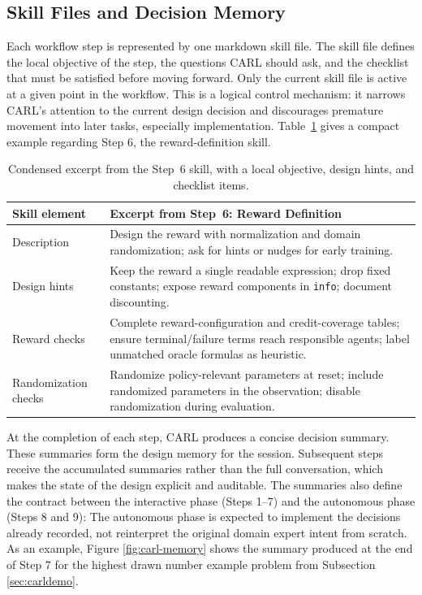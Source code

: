\documentclass[mnsc,sglanonrev]{informs4}
\begin{document}
\subsection{Skill Files and Decision Memory}
\label{skillz}

Each workflow step is represented by one markdown skill file. The skill file defines the local objective of the step, the questions CARL should ask, and the checklist that must be satisfied before moving forward. Only the current skill file is active at a given point in the workflow. This is a logical control mechanism: it narrows CARL's attention to the current design decision and discourages premature movement into later tasks, especially implementation. Table~\ref{tab:skill-excerpt} gives a compact example regarding Step 6, the reward-definition skill.

\begin{table}[ht]
\centering
\small
\begin{tabular}{@{}p{}p{}@{}}
\toprule
\textbf{Skill element} & \textbf{Excerpt from Step~6: Reward Definition}\\ \midrule
Description & Design the reward with normalization and domain randomization; ask for hints or nudges for early training.\\
Design hints & Keep the reward a single readable expression; drop fixed constants; expose reward components in \texttt{info}; document discounting.\\
Reward checks & Complete reward-configuration and credit-coverage tables; ensure terminal/failure terms reach responsible agents; label unmatched oracle formulas as heuristic.\\
Randomization checks & Randomize policy-relevant parameters at reset; include randomized parameters in the observation; disable randomization during evaluation.\\ \bottomrule
\end{tabular}
\caption{Condensed excerpt from the Step~6 skill, with a local objective, design hints, and checklist items.}
\label{tab:skill-excerpt}
\end{table}

At the completion of each step, CARL produces a concise decision summary. These summaries form the design memory for the session. Subsequent steps receive the accumulated summaries rather than the full conversation, which makes the state of the design explicit and auditable. The summaries also define the contract between the interactive phase (Steps 1--7) and the autonomous phase (Steps 8 and 9): The autonomous phase is expected to implement the decisions already recorded, not reinterpret the original domain expert intent from scratch. As an example, Figure \ref{fig:carl-memory} shows the summary produced at the end of Step 7 for the highest drawn number example problem from Subsection \ref{sec:carldemo}.
\end{document}
